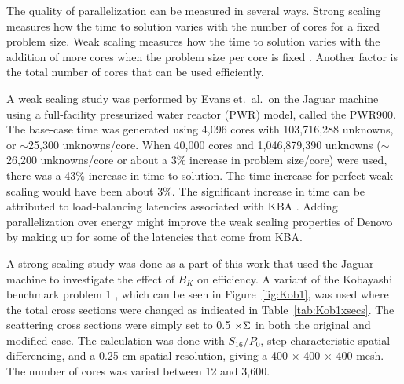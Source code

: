 The quality of parallelization can be measured in several ways. Strong scaling measures how the time to solution varies with the number of cores for a fixed problem size. Weak scaling measures how the time to solution varies with the addition of more cores when the problem size per core is fixed \cite{Bush2010}. Another factor is the total number of cores that can be used efficiently. 

A weak scaling study was performed by Evans et.\ al.\ on the Jaguar machine using a full-facility pressurized water reactor (PWR) model, called the PWR900. The base-case time was generated using 4,096 cores with 103,716,288 unknowns, or $\sim$25,300 unknowns/core. When 40,000 cores and 1,046,879,390 unknowns ($\sim$26,200 unknowns/core or about a 3\% increase in problem size/core) were used, there was a 43\% increase in time to solution. The time increase for perfect weak scaling would have been about 3\%. The significant increase in time can be attributed to load-balancing latencies associated with KBA \cite{Evans2009d}. Adding parallelization over energy might improve the weak scaling properties of Denovo by making up for some of the latencies that come from KBA.

A strong scaling study was done as a part of this work that used the Jaguar machine to investigate the effect of $B_{K}$ on efficiency. A variant of the Kobayashi benchmark problem 1 \cite{Kobayashi2000}, which can be seen in Figure~\ref{fig:Kob1}, was used where the total cross sections were changed as indicated in Table~\ref{tab:Kob1xsecs}. The scattering cross sections were simply set to 0.5 $\times \Sigma$ in both the original and modified case. The calculation was done with $S_{16}/P_{0}$, step characteristic spatial differencing, and a 0.25 cm spatial resolution, giving a 400 $\times$ 400 $\times$ 400 mesh.  The number of cores was varied between 12 and 3,600. 

